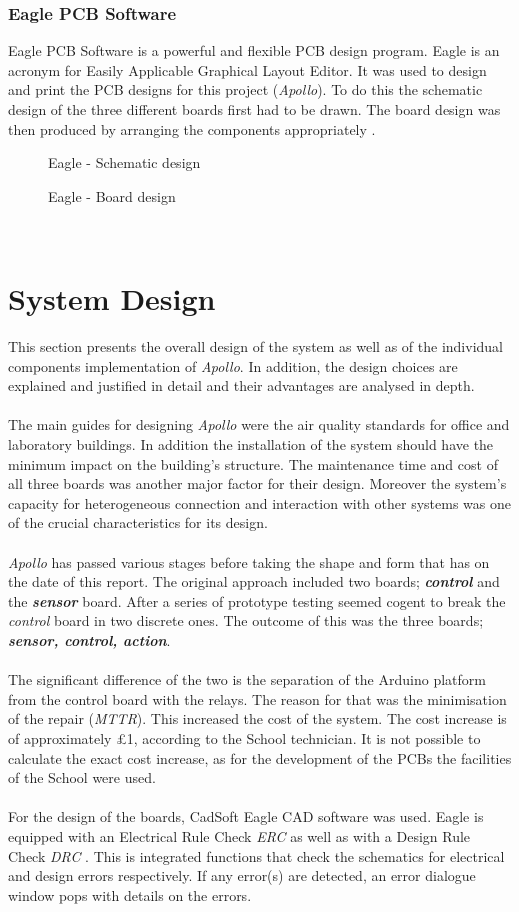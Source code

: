 \documentclass[12pt,a4paper]{report}
\begin{document}
\subsection{Eagle PCB Software}
Eagle PCB Software is a powerful and flexible PCB design program. Eagle is an acronym for Easily Applicable Graphical Layout Editor. It was used to design and print the PCB designs for this project (\emph{Apollo}). To do this the schematic design of the three different boards first had to be drawn. The board design was then produced by arranging the components appropriately \cite{website:eagle}.
\begin{figure}[H]
\centering
    \caption{Eagle - Schematic design}

    \caption{Eagle - Board design}
\end{figure}
\ \\
\newpage
\chapter{System Design}
This section presents the overall design of the system as well as of the individual components implementation of \emph{Apollo}. In addition, the design choices are explained and justified in detail and their advantages are analysed in depth.\\
\ \\
The main guides for designing \emph{Apollo} were the air quality standards for office and laboratory buildings. In addition the installation of the system should have the minimum impact on the building's structure. The maintenance time and cost of all three boards was another major factor for their design. Moreover the system's capacity for heterogeneous connection and interaction with other systems was one of the crucial characteristics for its design. \\
\ \\
\emph{Apollo} has passed various stages before taking the shape and form that has on the date of this report. The original approach included two boards; \textbf{\textit{control}} and the \textbf{\textit{sensor}} board. After a series of prototype testing seemed cogent to break the \textit{control} board in two discrete ones. The outcome of this was the three boards; \textbf{\textit{sensor, control, action}}.\\
\ \\
The significant difference of the two is the separation of the Arduino platform from the control board with the relays. The reason for that was the minimisation of the repair (\textit{MTTR}). This increased the cost of the system. The cost increase is of approximately £1, according to the School technician. It is not possible to calculate the exact cost increase, as for the development of the PCBs the facilities of the School were used.\\
\ \\
For the design of the boards, CadSoft Eagle CAD software was used. Eagle is equipped with an Electrical Rule Check \textit{ERC} as well as with a Design Rule Check \textit{DRC} . This is integrated functions that check the schematics for electrical and design errors respectively. If any error(s) are detected, an error dialogue window pops with details on the errors.
%
\end{document}
